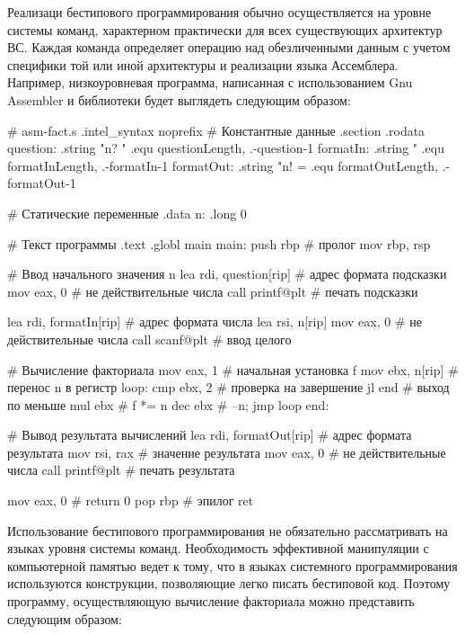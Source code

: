 Реализаци бестипового программирования обычно осуществляется на уровне системы команд, характерном практически для всех существующих архитектур ВС. Каждая команда определяет операцию над обезличенными данным с учетом специфики той или иной архитектуры и реализации языка Ассемблера. Например, низкоуровневая программа, написанная с использованием Gnu Assembler и библиотеки  будет выглядеть следующим образом:

\begin{ffcode}
# asm-fact.s
    .intel_syntax noprefix
# Константные данные
    .section  .rodata
question:
    .string "n? "
    .equ    questionLength, .-question-1
formatIn:
    .string "%
    .equ    formatInLength, .-formatIn-1
formatOut:
    .string "n! = %
    .equ    formatOutLength, .-formatOut-1

# Статические переменные
    .data
n:  .long   0

# Текст программы
    .text
    .globl  main
main:
    push    rbp                     # пролог
    mov     rbp, rsp

    # Ввод начального значения n
    lea     rdi, question[rip]      # адрес формата подсказки
    mov     eax, 0                  # не действительные числа
    call    printf@plt              # печать подсказки

    lea     rdi, formatIn[rip]      # адрес формата числа
    lea     rsi, n[rip]
    mov     eax, 0                  # не действительные числа
    call    scanf@plt               # ввод целого

    # Вычисление факториала
    mov     eax, 1                  # начальная установка f
    mov     ebx, n[rip]             # перенос n в регистр
loop:
    cmp     ebx, 2                  # проверка на завершение
    jl      end                     # выход по меньше
    mul     ebx                     # f *= n
    dec     ebx                     # --n;
    jmp     loop
end:

    # Вывод результата вычислений
    lea     rdi, formatOut[rip]     # адрес формата результата
    mov     rsi, rax                # значение результата
    mov     eax, 0                  # не действительные числа
    call    printf@plt              # печать результата

    mov     eax, 0                  # return 0
    pop     rbp                     # эпилог
    ret
\end{ffcode}

Использование бестипового программирования не обязательно рассматривать на языках уровня системы команд. Необходимость эффективной манипуляции с компьютерной памятью ведет к тому, что в языках системного программирования используются конструкции, позволяющие легко писать бестиповой код. Поэтому программу, осуществляющую вычисление факториала можно представить следующим образом:

